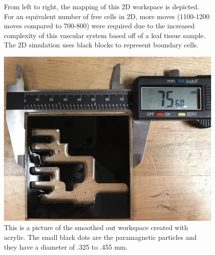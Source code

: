 \documentclass[letterpaper, 9 pt, conference]{ieeeconf}  %
\begin{document}
\begin{figure}
	\caption{From left to right, the mapping of this 2D workspace is depicted. For an equivalent number of free cells in 2D, more moves (1100-1200 moves compared to 700-800) were required due to the increased complexity of this vascular system based off of a leaf tissue sample. The 2D simulation uses black blocks to represent boundary cells.}
	\includegraphics[height=0.10\paperheight]{Optimized-Workspace.jpg}
\caption{
This is a picture of the smoothed out workspace created with acrylic. The small black dots are the paramagnetic particles and they have a diameter of .325 to .455 mm. 
}
\end{figure}


\end{document}
